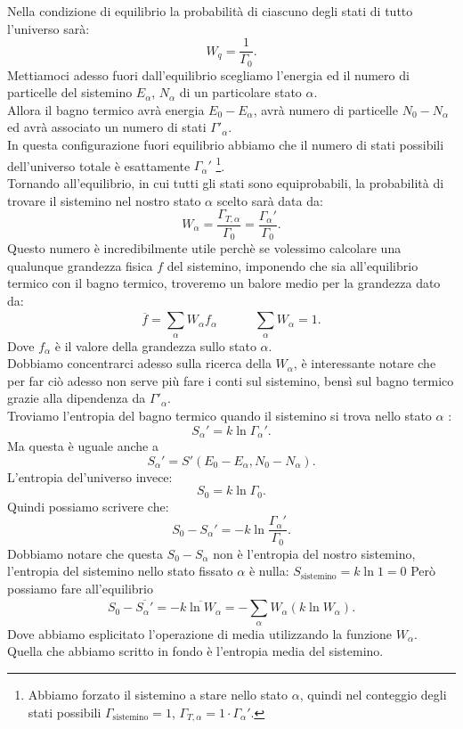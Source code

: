 Nella condizione di equilibrio la probabilità di ciascuno degli stati di tutto l'universo sarà:
\[
	W_{q}= \frac{1}{\Gamma_0}
.\]
Mettiamoci adesso fuori dall'equilibrio scegliamo l'energia ed il numero di particelle del sistemino $E_{\alpha}$, $N_{\alpha}$ di un particolare stato $\alpha$.\\
Allora il bagno termico avrà energia $E_0- E_{\alpha}$, avrà numero di particelle $N_0-N_{\alpha}$ ed avrà associato un numero di stati $\Gamma'_{\alpha}$.\\
In questa configurazione fuori equilibrio abbiamo che il numero di stati possibili dell'universo totale è esattamente $\Gamma_{\alpha}'$ \footnote{Abbiamo forzato il sistemino a stare nello stato $\alpha$, quindi nel conteggio degli stati possibili $\Gamma_{\text{sistemino}}=1$, $\Gamma_{T, \alpha}=1\cdot \Gamma_{\alpha}'$.}.\\
Tornando all'equilibrio, in cui tutti gli stati sono equiprobabili, la probabilità di trovare il sistemino nel nostro stato $\alpha$ scelto sarà data da:
\[
	W_{\alpha}= \frac{\Gamma_{T,\alpha}}{\Gamma_0}= \frac{\Gamma_{\alpha}'}{\Gamma_0}
.\] 
Questo numero è incredibilmente utile perchè se volessimo calcolare una qualunque grandezza fisica $f$ del sistemino, imponendo che sia all'equilibrio termico con il bagno termico, troveremo un balore medio per la grandezza dato da:
\[
	\overline{f}= \sum_{\alpha}^{} W_{\alpha}f_{\alpha} \quad \quad \quad \sum_{\alpha}^{} W_\alpha= 1
.\] 
Dove $f_{\alpha}$ è il valore della grandezza sullo stato $\alpha$.\\
Dobbiamo concentrarci adesso sulla ricerca della $W_{\alpha}$, è interessante notare che per far ciò adesso non serve più fare i conti sul sistemino, bensì sul bagno termico grazie alla dipendenza da $\Gamma'_{\alpha}$.\\
Troviamo l'entropia del bagno termico quando il sistemino si trova nello stato $\alpha$ :
\[
	S_{\alpha}'= k\ln\Gamma_{\alpha}'
.\] 
Ma questa è uguale anche a 
\[
	S_{\alpha}'= S'\left( E_0-E_{\alpha}, N_0-N_{\alpha} \right) 
.\] 
L'entropia del'universo invece:
\[
	S_0= k \ln \Gamma_0
.\] 
Quindi possiamo scrivere che:
\[
	S_0-S_{\alpha}'= -k \ln \frac{\Gamma_{\alpha}'}{\Gamma_0}
.\] 
Dobbiamo notare che questa $S_0- S_{\alpha}$ non è l'entropia del nostro sistemino, l'entropia del sistemino nello stato fissato $\alpha$ è nulla: $S_{\text{sistemino}} = k\ln1 = 0$
Però possiamo fare all'equilibrio 
\[
	S_0- \overline{S_{\alpha}'}= - \overline{k\ln W_{\alpha}}= -\sum_{\alpha}^{} W_{\alpha} \left( k\ln W_{\alpha} \right)  
.\] 
Dove abbiamo esplicitato l'operazione di media utilizzando la funzione $W_{\alpha}$. Quella che abbiamo scritto in fondo è l'entropia media del sistemino.\\
